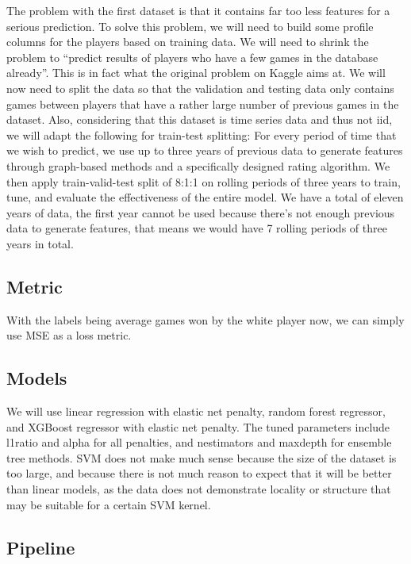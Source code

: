 \documentclass[12pt, letterpaper]{article}
\begin{document}
\begin{multicols}{2}
The problem with the first dataset is that it contains far too less features for a serious prediction. To solve this problem, we will need to build some profile columns for the players based on training data. We will need to shrink the problem to “predict results of players who have a few games in the database already”. This is in fact what the original problem on Kaggle aims at. We will now need to split the data so that the validation and testing data only contains games between players that have a rather large number of previous games in the dataset. Also, considering that this dataset is time series data and thus not iid, we will adapt the following for train-test splitting: For every period of time that we wish to predict, we use up to three years of previous data to generate features through graph-based methods and a specifically designed rating algorithm. We then apply train-valid-test split of 8:1:1 on rolling periods of three years to train, tune, and evaluate the effectiveness of the entire model. We have a total of eleven years of data, the first year cannot be used because there’s not enough previous data to generate features, that means we would have 7 rolling periods of three years in total.

\subsection*{Metric}

With the labels being average games won by the white player now, we can simply use MSE as a loss metric. 

\subsection*{Models}

We will use linear regression with elastic net penalty, random forest regressor, and XGBoost regressor with elastic net penalty. The tuned parameters include l1\textunderscore ratio and alpha for all penalties, and n\textunderscore estimators and max\textunderscore depth for ensemble tree methods. SVM does not make much sense because the size of the dataset is too large, and because there is not much reason to expect that it will be better than linear models, as the data does not demonstrate locality or structure that may be suitable for a certain SVM kernel.

\subsection*{Pipeline}


\end{multicols}
\end{document}
